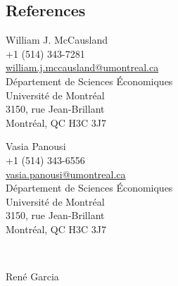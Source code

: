 \documentclass[margin,line]{res}
\begin{document}
\begin{resume}
\section{\sc References}
\vspace{.075in}
\begin{minipage}{0.45\resumewidth}
  William J. McCausland                                                                   \\
  +1 (514) 343-7281                                                                       \\
  \href{mailto:william.j.mccausland@umontreal.ca}{william.j.mccausland@umontreal.ca}      \\
  D\'epartement de Sciences \'Economiques                                                 \\
  Universit\'e de Montr\'eal                                                              \\
  3150, rue Jean-Brillant                                                                 \\
  Montr\'eal, QC  H3C 3J7                                                                 \\ 
\end{minipage}
\begin{minipage}{0.45\resumewidth}
  Vasia Panousi                                                                           \\
  +1 (514) 343-6556                                                                       \\
  \href{mailto:vasia.panousi@umontreal.ca}{vasia.panousi@umontreal.ca}                    \\
  D\'epartement de Sciences \'Economiques                                                 \\
  Universit\'e de Montr\'eal                                                              \\
  3150, rue Jean-Brillant                                                                 \\
  Montr\'eal, QC  H3C 3J7                                                                 \\ 
\end{minipage}
\vspace{0.2in} \\
\begin{minipage}{0.45\resumewidth}
  Ren\'e Garcia                                                                           \\

\end{minipage}
\end{resume}
\end{document}
